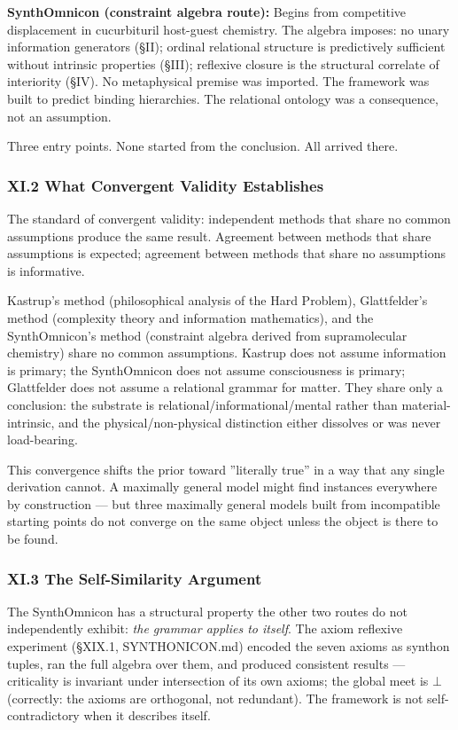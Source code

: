 \documentclass[12pt,a4paper]{article}
\begin{document}
\textbf{SynthOmnicon (constraint algebra route):} Begins from competitive displacement in cucurbituril host-guest chemistry. The algebra imposes: no unary information generators (§II); ordinal relational structure is predictively sufficient without intrinsic properties (§III); reflexive closure is the structural correlate of interiority (§IV). No metaphysical premise was imported. The framework was built to predict binding hierarchies. The relational ontology was a consequence, not an assumption.

Three entry points. None started from the conclusion. All arrived there.

\subsubsection{XI.2 What Convergent Validity Establishes}

The standard of convergent validity: independent methods that share no common assumptions produce the same result. Agreement between methods that share assumptions is expected; agreement between methods that share no assumptions is informative.

Kastrup's method (philosophical analysis of the Hard Problem), Glattfelder's method (complexity theory and information mathematics), and the SynthOmnicon's method (constraint algebra derived from supramolecular chemistry) share no common assumptions. Kastrup does not assume information is primary; the SynthOmnicon does not assume consciousness is primary; Glattfelder does not assume a relational grammar for matter. They share only a conclusion: the substrate is relational/informational/mental rather than material-intrinsic, and the physical/non-physical distinction either dissolves or was never load-bearing.

This convergence shifts the prior toward ''literally true'' in a way that any single derivation cannot. A maximally general model might find instances everywhere by construction --- but three maximally general models built from incompatible starting points do not converge on the same object unless the object is there to be found.

\subsubsection{XI.3 The Self-Similarity Argument}

The SynthOmnicon has a structural property the other two routes do not independently exhibit: \emph{the grammar applies to itself}. The axiom reflexive experiment (§XIX.1, SYNTHONICON.md) encoded the seven axioms as synthon tuples, ran the full algebra over them, and produced consistent results --- criticality is invariant under intersection of its own axioms; the global meet is $\bot$ (correctly: the axioms are orthogonal, not redundant). The framework is not self-contradictory when it describes itself.
\end{document}
